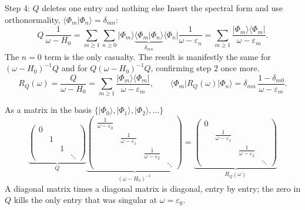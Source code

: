 \documentclass[aspectratio=169,10pt]{beamer}
\newcommand{\ket}[1]{\vert #1\rangle}
\newcommand{\bra}[1]{\langle #1\vert}
\newcommand{\braket}[2]{\langle #1\vert #2\rangle}
\newcommand{\ketbra}[2]{\vert #1\rangle\langle #2\vert}
\newcommand{\mel}[3]{\langle #1\lvert #2\rvert #3\rangle}
\newcommand{\ph}{\Phi_0}
\begin{document}
\begin{frame}[shrink=15]{Step 4: \(Q\) deletes one entry and nothing else}
Insert the spectral form and use orthonormality, \(\braket{\Phi_m}{\Phi_n}=\delta_{mn}\):
\[
Q\,\frac{1}{\omega-H_0}
=\sum_{m\ge1}\sum_{n\ge0}\ket{\Phi_m}\underbrace{\braket{\Phi_m}{\Phi_n}}_{\delta_{mn}}\bra{\Phi_n}\frac{1}{\omega-\varepsilon_n}
=\sum_{m\ge1}\frac{\ketbra{\Phi_m}{\Phi_m}}{\omega-\varepsilon_m}.
\]
The \(n=0\) term is the only casualty. The result is manifestly the same for \((\omega-H_0)^{-1}Q\) and for \(Q(\omega-H_0)^{-1}Q\), confirming step 2 once more.
\[
\boxed{\;
R_Q(\omega)=\frac{Q}{\omega-H_0}=\sum_{m\ge1}\frac{\ketbra{\Phi_m}{\Phi_m}}{\omega-\varepsilon_m},
\qquad
\mel{\Phi_m}{R_Q(\omega)}{\Phi_n}=\delta_{mn}\,\frac{1-\delta_{m0}}{\omega-\varepsilon_m}.
\;}
\]
\begin{block}{As a matrix in the basis \(\{\ket{\ph},\ket{\Phi_1},\ket{\Phi_2},\dots\}\)}
\[
\underbrace{\begin{pmatrix}0&&&\\&1&&\\&&1&\\&&&\ddots\end{pmatrix}}_{Q}
\underbrace{\begin{pmatrix}\frac{1}{\omega-\varepsilon_0}&&&\\&\frac{1}{\omega-\varepsilon_1}&&\\&&\frac{1}{\omega-\varepsilon_2}&\\&&&\ddots\end{pmatrix}}_{(\omega-H_0)^{-1}}
=
\underbrace{\begin{pmatrix}0&&&\\&\frac{1}{\omega-\varepsilon_1}&&\\&&\frac{1}{\omega-\varepsilon_2}&\\&&&\ddots\end{pmatrix}}_{R_Q(\omega)}
\]
A diagonal matrix times a diagonal matrix is diagonal, entry by entry; the zero in \(Q\) kills the only entry that was singular at \(\omega=\varepsilon_0\).
\end{block}
\end{frame}
\end{document}
